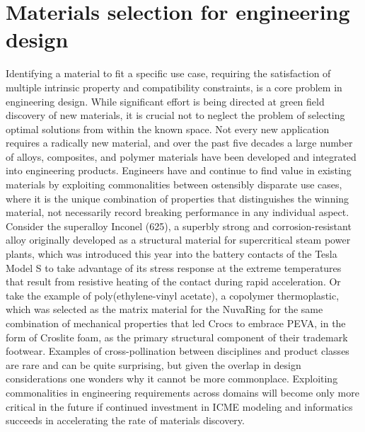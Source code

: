 
\section{Materials selection for engineering design}

Identifying a material to fit a specific use case, requiring the satisfaction of multiple intrinsic property and compatibility constraints, is a core problem in engineering design. 
While significant effort is being directed at green field discovery of new materials, it is crucial not to neglect the problem of selecting optimal solutions from within the known space. 
Not every new application requires a radically new material, and over the past five decades a large number of alloys, composites, and polymer materials have been developed and integrated into engineering products. 
Engineers have and continue to find value in existing materials by exploiting commonalities between ostensibly disparate use cases, where it is the unique combination of properties that distinguishes the winning material, not necessarily record breaking performance in any individual aspect.
Consider the superalloy Inconel (625), a superbly strong and corrosion-resistant alloy originally developed as a structural material for supercritical steam power plants\cite{Eiselstein1991}, which was introduced this year into the battery contacts of the Tesla\textsuperscript{\textregistered} Model S to take advantage of its stress response at the extreme temperatures that result from resistive heating of the contact during rapid acceleration\cite{Musk2015}.
Or take the example of poly(ethylene-vinyl acetate), a copolymer thermoplastic, which was selected as the matrix material for the NuvaRing\cite{Sarkar2005} for the same combination of mechanical properties that led Crocs\textsuperscript{\texttrademark} to embrace PEVA, in the form of Croslite\textsuperscript{\textregistered} foam, as the primary structural component of their trademark footwear. 
Examples of cross-pollination between disciplines and product classes are rare and can be quite surprising, but given the overlap in design considerations one wonders why it cannot be more commonplace. 
Exploiting commonalities in engineering requirements across domains will become only more critical in the future if continued investment in ICME modeling and informatics succeeds in accelerating the rate of materials discovery. 


